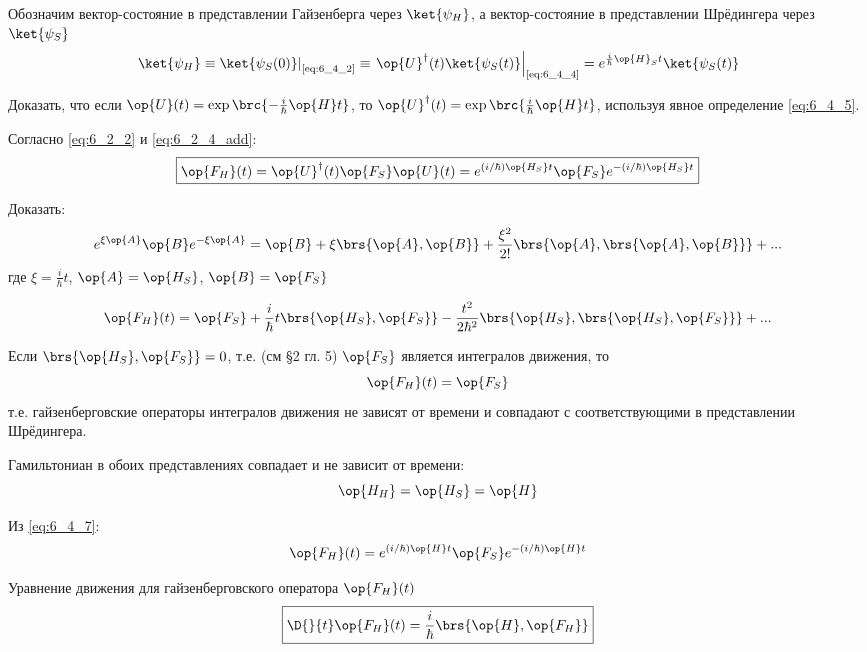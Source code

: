 Обозначим вектор-состояние в представлении Гайзенберга через $\ket{\psi_H}$, а вектор-состояние в представлении Шрёдингера через $\ket{\psi_S}$
\begin{equation}
\label{eq:6_4_6}
	\left. \ket{\psi_H} \equiv \ket{\psi_S(0)} \right|_\text{\eqref{eq:6_4_2}} \equiv 
	\left.  \op{U}^\dag(t) \ket{\psi_S(t)} \right|_\text{\eqref{eq:6_4_4}} =
	e^{\frac{i}{\hbar}\op{H}_St} \ket{\psi_S(t)}
\end{equation}

\begin{excr}
Доказать, что если $\op{U}(t)=\exp\brc{-\frac{i}{\hbar}\op{H}t}$, то $\op{U}^\dag(t) = \exp\brc{\frac{i}{\hbar}\op{H}t}$, используя явное определение \eqref{eq:6_4_5}.
\end{excr}

Согласно \eqref{eq:6_2_2} и \eqref{eq:6_2_4_add}:
\begin{equation}
\label{eq:6_4_7}
\boxed{
	\op{F_H}(t) = \op{U}^\dag(t) \op{F_S} \op{U}(t) = e^{(i/\hbar) \op{H_S}t} \op{F_S} e^{-(i/\hbar) \op{H_S}t}
}
\end{equation}

\begin{excr}
Доказать:
$$
e^{\xi \op{A}} \op{B} e^{-\xi \op{A}} = \op{B} + \xi \brs{\op{A}, \op{B}} + \frac{\xi^2}{2!} \brs{\op{A}, \brs{\op{A}, \op{B}}} + ...
$$
где $\xi = \frac{i}{\hbar} t$, $\op{A} = \op{H_S}$, $\op{B} = \op{F_S}$
\end{excr}

\begin{equation}
\label{eq:6_4_8}
\op{F_H}(t) = \op{F_S} + \frac{i}{\hbar} t \brs{\op{H_S}, \op{F_S}} - \frac{t^2}{2\hbar^2} \brs{\op{H_S}, \brs{\op{H_S}, \op{F_S}}} + ...
\end{equation}

Если $\brs{\op{H_S}, \op{F_S}} = 0$, т.е. (см \S 2 гл. 5) $\op{F_S}$ является интегралов движения, то
$$
\op{F_H}(t) = \op{F_S}
$$
т.е. гайзенберговские операторы интегралов движения не зависят от времени и совпадают с соответствующими в представлении Шрёдингера.

Гамильтониан в обоих представлениях совпадает и не зависит от времени:
$$
\op{H_H} = \op{H_S} = \op{H}
$$

Из \eqref{eq:6_4_7}:
\begin{equation}
\label{eq:6_4_9}
\op{F_H}(t) = e^{(i/\hbar)\op{H}t} \op{F_S} e^{-(i/\hbar)\op{H}t}
\end{equation}

Уравнение движения для гайзенберговского оператора $\op{F_H}(t)$
\begin{equation}
\label{eq:6_4_10}
\boxed{
	\D{}{t}\op{F_H}(t) = \frac{i}{\hbar} \brs{\op{H}, \op{F_H}}
}
\end{equation}

